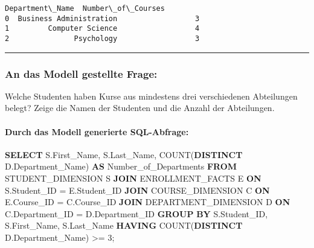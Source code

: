 \documentclass[11pt]{article}
\newenvironment{Shaded}{}{}
\newcommand{\KeywordTok}[1]{\textcolor[rgb]{0.00,0.44,0.13}{\textbf{{#1}}}}
\newcommand{\DecValTok}[1]{\textcolor[rgb]{0.25,0.63,0.44}{{#1}}}
\newcommand{\FunctionTok}[1]{\textcolor[rgb]{0.02,0.16,0.49}{{#1}}}
\newcommand{\NormalTok}[1]{{#1}}
\newcommand{\OperatorTok}[1]{\textcolor[rgb]{0.40,0.40,0.40}{{#1}}}
\begin{document}
    
    
    \begin{Verbatim}[commandchars=\\\{\}]
           Department\_Name  Number\_of\_Courses
0  Business Administration                  3
1         Computer Science                  4
2               Psychology                  3
    \end{Verbatim}

    
    \begin{center}\rule{0.5\linewidth}{0.5pt}\end{center}

    
    \hypertarget{an-das-modell-gestellte-frage}{%
\subsubsection{An das Modell gestellte
Frage:}\label{an-das-modell-gestellte-frage}}

Welche Studenten haben Kurse aus mindestens drei verschiedenen
Abteilungen belegt? Zeige die Namen der Studenten und die Anzahl der
Abteilungen.

    
    \hypertarget{durch-das-modell-generierte-sql-abfrage}{%
\paragraph{Durch das Modell generierte
SQL-Abfrage:}\label{durch-das-modell-generierte-sql-abfrage}}

\begin{Shaded}
\begin{Highlighting}[]
\KeywordTok{SELECT}\NormalTok{ S.First\_Name, S.Last\_Name, }\FunctionTok{COUNT}\NormalTok{(}\KeywordTok{DISTINCT}\NormalTok{ D.Department\_Name) }\KeywordTok{AS}\NormalTok{ Number\_of\_Departments}
\KeywordTok{FROM}\NormalTok{ STUDENT\_DIMENSION S}
\KeywordTok{JOIN}\NormalTok{ ENROLLMENT\_FACTS E }\KeywordTok{ON}\NormalTok{ S.Student\_ID }\OperatorTok{=}\NormalTok{ E.Student\_ID}
\KeywordTok{JOIN}\NormalTok{ COURSE\_DIMENSION C }\KeywordTok{ON}\NormalTok{ E.Course\_ID }\OperatorTok{=}\NormalTok{ C.Course\_ID}
\KeywordTok{JOIN}\NormalTok{ DEPARTMENT\_DIMENSION D }\KeywordTok{ON}\NormalTok{ C.Department\_ID }\OperatorTok{=}\NormalTok{ D.Department\_ID}
\KeywordTok{GROUP} \KeywordTok{BY}\NormalTok{ S.Student\_ID, S.First\_Name, S.Last\_Name}
\KeywordTok{HAVING} \FunctionTok{COUNT}\NormalTok{(}\KeywordTok{DISTINCT}\NormalTok{ D.Department\_Name) }\OperatorTok{\textgreater{}=} \DecValTok{3}\NormalTok{;}
\end{Highlighting}
\end{Shaded}
\end{document}
